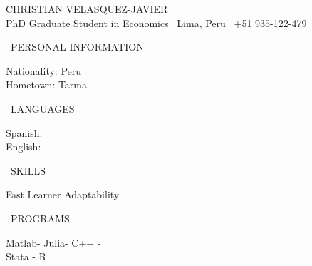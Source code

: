 \documentclass[11pt, a4paper]{article}
\begin{document}
	\begin{center}
		\huge{CHRISTIAN VELASQUEZ-JAVIER}\\ \vskip5pt
		\small{PhD Graduate Student in Economics \quad \faMapMarker \, Lima, Peru \quad \faMobilePhone \, +51 935-122-479}
	\end{center}
\vspace{0.5cm}
\begin{minipage}[l]{0.19\linewidth}
\vspace{-6.5cm}
\footnotesize 
\begin{center} \faChild \, PERSONAL INFORMATION \faChild \end{center}
\vspace{-10pt}
	Nationality: Peru\\
	Hometown: Tarma\\
\begin{center}\faGlobe\, LANGUAGES \faGlobe \end{center}
\vspace{-10pt}
Spanish: \faStar\faStar\faStar\faStar\faStar  \\
English: \faStar\faStar\faStar\faStar\faStarHalfEmpty \\
\begin{center} \faThumbsUp  \, SKILLS  \faThumbsUp \end{center}
\vspace{-10pt}
\centering Fast Learner \quad  Adaptability \\
\begin{center} \faCode\, PROGRAMS \faCode \end{center}
\vspace{-10pt}
\centering Matlab- Julia- C++ - \\ Stata - R
\end{minipage}
\end{document}
